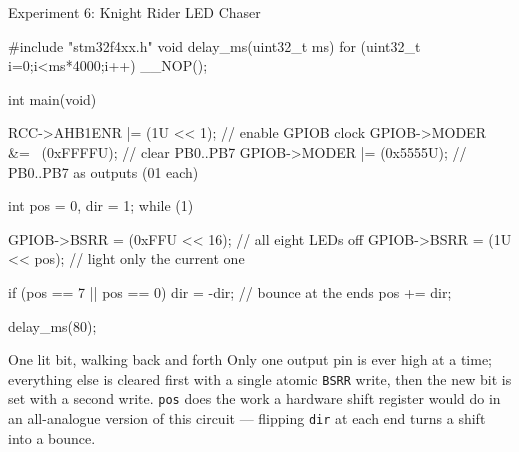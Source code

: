 \documentclass[9pt,aspectratio=169,xcolor=table]{beamer}
\begin{document}
%
%

{\beamerextras
\begin{frame}[fragile]{Experiment 6: Knight Rider LED Chaser}
	\begin{cc}[basicstyle=\ttfamily\scriptsize]
#include "stm32f4xx.h"
void delay_ms(uint32_t ms) { for (uint32_t i=0;i<ms*4000;i++) __NOP(); }

int main(void) {
	RCC->AHB1ENR |= (1U << 1);      // enable GPIOB clock
	GPIOB->MODER &= ~(0xFFFFU);     // clear PB0..PB7
	GPIOB->MODER |=  (0x5555U);     // PB0..PB7 as outputs (01 each)

	int pos = 0, dir = 1;
	while (1) {
		GPIOB->BSRR = (0xFFU << 16);   // all eight LEDs off
		GPIOB->BSRR = (1U << pos);     // light only the current one

		if (pos == 7 || pos == 0) dir = -dir;  // bounce at the ends
		pos += dir;

		delay_ms(80);
	}
}
\end{cc}

	\vspace{0.5mm}
	\begin{block}{One lit bit, walking back and forth}
		Only one output pin is ever high at a time; everything else is
		cleared first with a single \alert{atomic} \texttt{BSRR} write,
		then the new bit is set with a second write. \texttt{pos} does
		the work a hardware shift register would do in an all-analogue
		version of this circuit --- flipping \texttt{dir} at each end
		turns a shift into a \alert{bounce}.
	\end{block}
\end{frame}
}
\end{document}
